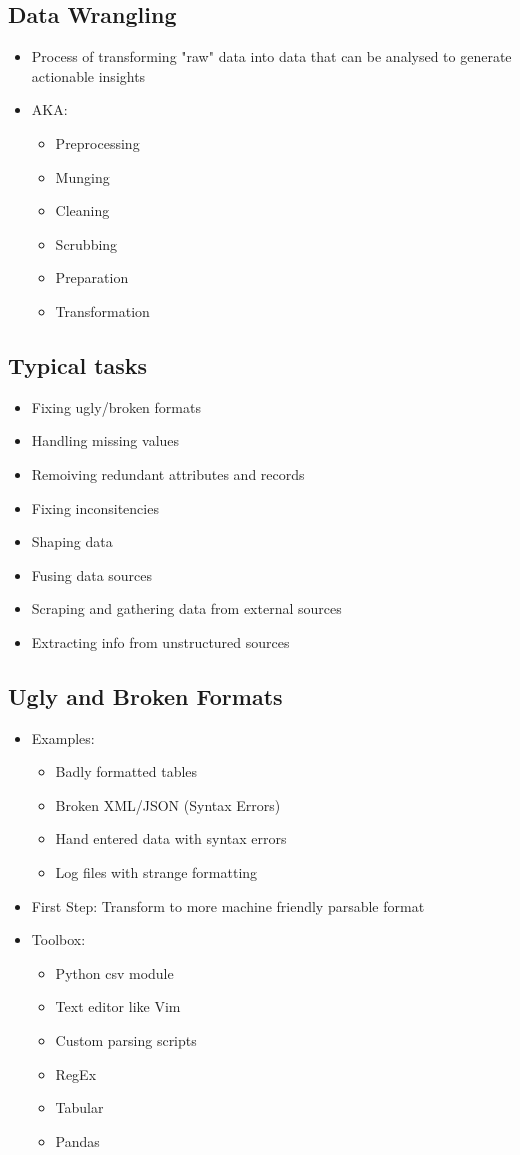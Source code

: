 \documentclass[a4paper]{article}
\begin{document}
\subsection{Data Wrangling}
\begin{itemize}
	\item Process of transforming "raw" data into data that can be analysed
		to generate actionable insights
	\item AKA:
	\begin{itemize}
		\item Preprocessing
		\item Munging
		\item Cleaning
		\item Scrubbing
		\item Preparation
		\item Transformation
	\end{itemize}
\end{itemize}
\subsection{Typical tasks}
\begin{itemize}
	\item Fixing ugly/broken formats
	\item Handling missing values
	\item Remoiving redundant attributes and records
	\item Fixing inconsitencies
	\item Shaping data
	\item Fusing data sources
	\item Scraping and gathering data from external sources
	\item Extracting info from unstructured sources
\end{itemize}
\subsection{Ugly and Broken Formats}
\begin{itemize}
	\item Examples:
	\begin{itemize}
		\item Badly formatted tables
		\item Broken XML/JSON (Syntax Errors)
		\item Hand entered data with syntax errors
		\item Log files with strange formatting
	\end{itemize}
	\item First Step: Transform to more machine friendly parsable format
	\item Toolbox:
	\begin{itemize}
		\item Python csv module
		\item Text editor like Vim
		\item Custom parsing scripts
		\item RegEx
		\item Tabular
		\item Pandas
	\end{itemize}
\end{itemize}
\end{document}

